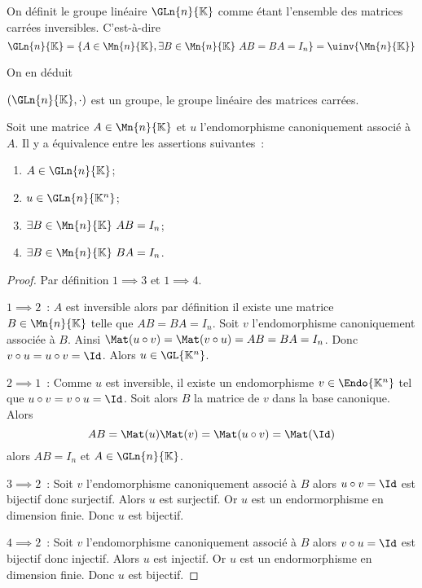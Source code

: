 On définit le groupe linéaire $\GLn{n}{\K}$ comme étant l'ensemble des matrices carrées inversibles. C'est-à-dire
\begin{equation}
  \GLn{n}{\K}=\{A \in \Mn{n}{\K}, \exists B \in \Mn{n}{\K} \ AB=BA=I_n\}=\uinv{\Mn{n}{\K}}
\end{equation}

On en déduit
\begin{theo}
  $(\GLn{n}{\K},\cdot)$  est un groupe, le groupe linéaire des matrices carrées.
\end{theo}


\begin{theo}
  Soit une matrice $A \in \Mn{n}{\K}$ et $u$ l'endomorphisme canoniquement associé à $A$. Il y a équivalence entre les assertions suivantes~:
  \begin{enumerate}
  \item $A \in \GLn{n}{\K}$;
  \item $u \in \GLn{n}{\K^n}$;
  \item $\exists B \in \Mn{n}{\K} \ AB=I_n$;
  \item $\exists B \in \Mn{n}{\K} \ BA=I_n$.
  \end{enumerate}
\end{theo}
\begin{proof}
  Par définition $1 \implies 3$ et $1 \implies 4$. 

  $1 \implies 2$~: $A$ est inversible alors par définition il existe une matrice $B \in \Mn{n}{\K}$ telle que $AB=BA=I_n$. Soit $v$ l'endomorphisme canoniquement associée à $B$. Ainsi $\Mat(u \circ v) = \Mat(v \circ u) =AB=BA=I_n$. Donc $v \circ u=u \circ v=\Id$. Alors $u \in \GL{\K^n}$.

  $2 \implies 1$~: Comme $u$ est inversible, il existe un endomorphisme $v \in \Endo{\K^n}$ tel que $u \circ v=v \circ u=\Id$. Soit alors $B$ la matrice de $v$ dans la base canonique. Alors
  \begin{equation}
    AB=\Mat(u) \Mat(v)=\Mat(u \circ v)=\Mat(\Id)
  \end{equation}
  alors $AB=I_n$ et $A \in \GLn{n}{\K}$.

  $3 \implies 2$~: Soit $v$ l'endomorphisme canoniquement associé à $B$ alors $u\circ v=\Id$ est bijectif donc surjectif. Alors $u$ est surjectif. Or $u$ est un endormorphisme en dimension finie. Donc $u$ est bijectif.

  $4 \implies 2$~: Soit $v$ l'endomorphisme canoniquement associé à $B$ alors $v\circ u=\Id$ est bijectif donc injectif. Alors $u$ est injectif. Or $u$ est un endormorphisme en dimension finie. Donc $u$ est bijectif.
\end{proof}

